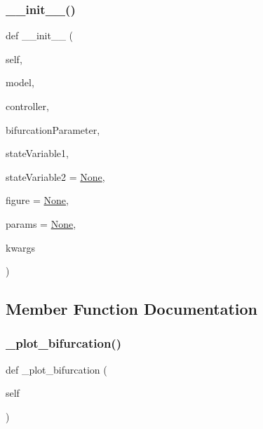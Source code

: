 \subsubsection{\texorpdfstring{\+\_\+\+\_\+init\+\_\+\+\_\+()}{\_\_init\_\_()}}
{\footnotesize\ttfamily def \+\_\+\+\_\+init\+\_\+\+\_\+ (\begin{DoxyParamCaption}\item[{}]{self,  }\item[{}]{model,  }\item[{}]{controller,  }\item[{}]{bifurcation\+Parameter,  }\item[{}]{state\+Variable1,  }\item[{}]{state\+Variable2 = {\ttfamily \hyperlink{class_mu_mo_t_1_1_mu_mo_t_1_1_mu_mo_tbifurcation_view_ac7485dcc8d256a6f197ed7802687f252}{None}},  }\item[{}]{figure = {\ttfamily \hyperlink{class_mu_mo_t_1_1_mu_mo_t_1_1_mu_mo_tbifurcation_view_ac7485dcc8d256a6f197ed7802687f252}{None}},  }\item[{}]{params = {\ttfamily \hyperlink{class_mu_mo_t_1_1_mu_mo_t_1_1_mu_mo_tbifurcation_view_ac7485dcc8d256a6f197ed7802687f252}{None}},  }\item[{}]{kwargs }\end{DoxyParamCaption})}



\subsection{Member Function Documentation}
\mbox{\label{class_mu_mo_t_1_1_mu_mo_t_1_1_mu_mo_tbifurcation_view_a385e5f82733060fec5122635ae6a8e67}} 
\subsubsection{\texorpdfstring{\+\_\+plot\+\_\+bifurcation()}{\_plot\_bifurcation()}}
{\footnotesize\ttfamily def \+\_\+plot\+\_\+bifurcation (\begin{DoxyParamCaption}\item[{}]{self }\end{DoxyParamCaption})\hspace{0.3cm}{\ttfamily [private]}}

